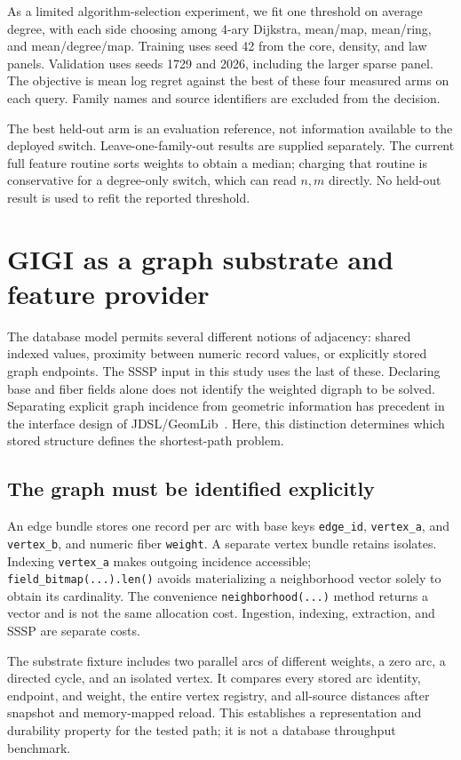 \documentclass[11pt]{article}
\newcommand{\code}[1]{\texttt{#1}}
\begin{document}
As a limited algorithm-selection experiment, we fit one threshold on average
degree, with each side choosing among 4-ary Dijkstra, mean/map, mean/ring, and
mean/degree/map. Training uses seed 42 from the core, density, and law panels.
Validation uses seeds 1729 and 2026, including the larger sparse panel. The
objective is mean log regret against the best of these four measured arms on
each query. Family names and source identifiers are excluded from the decision.

The best held-out arm is an evaluation reference, not information available to
the deployed switch. Leave-one-family-out results are supplied separately.
The current full feature routine sorts weights to obtain a median; charging that
routine is conservative for a degree-only switch, which can read $n,m$ directly.
No held-out result is used to refit the reported threshold.

\section{GIGI as a graph substrate and feature provider}
The database model permits several different notions of adjacency: shared
indexed values, proximity between numeric record values, or explicitly stored
graph endpoints. The SSSP input in this study uses the last of these. Declaring
base and fiber fields alone does not identify the weighted digraph to be solved.
Separating explicit graph incidence from geometric information has precedent
in the interface design of JDSL/GeomLib~\cite{tamassia-vismara}.
Here, this distinction determines which stored structure defines the
shortest-path problem.

\subsection{The graph must be identified explicitly}
An edge bundle stores one record per arc with base keys \code{edge\_id},
\code{vertex\_a}, and \code{vertex\_b}, and numeric fiber \code{weight}.
A separate vertex bundle retains isolates. Indexing \code{vertex\_a} makes
outgoing incidence accessible; \code{field\_bitmap(...).len()} avoids materializing
a neighborhood vector solely to obtain its cardinality. The convenience
\code{neighborhood(...)} method returns a vector and is not the same allocation
cost. Ingestion, indexing, extraction, and SSSP are separate costs.

The substrate fixture includes two parallel arcs of different weights, a zero
arc, a directed cycle, and an isolated vertex. It compares every stored arc
identity, endpoint, and weight, the entire vertex registry, and all-source
distances after snapshot and memory-mapped reload. 
This establishes a representation and durability property for the tested path;
it is not a database throughput benchmark.
\end{document}
